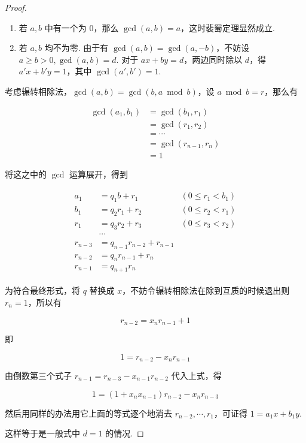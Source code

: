 \documentclass[a4paper]{article}
\begin{document}
\begin{proof}
    \begin{enumerate}
        \item 若 $a,b$ 中有一个为 $0$，那么 $\gcd(a,b)=a$，这时裴蜀定理显然成立. 
        \item 若 $a,b$ 均不为零. 由于有 $\gcd(a,b)=\gcd(a,-b)$，不妨设 $a\ge b>0,\gcd(a,b)=d$. 对于
              $ax+by=d$，两边同时除以 $d$，得 $a'x+b'y=1$，其中 $\gcd(a',b')=1$. 
    \end{enumerate}

    考虑辗转相除法，$\gcd(a,b)=\gcd(b,a\bmod b)$，设 $a\bmod b = r$，那么有

    \begin{equation*}
        \begin{split}
            \gcd(a_1,b_1)&=\gcd(b_1,r_1)\\
            &=\gcd(r_1,r_2)\\
            &=\cdots\\
            &=\gcd(r_{n-1},r_n)\\
            &=1
        \end{split}
    \end{equation*}

    将这之中的 $\gcd$ 运算展开，得到

    \begin{equation*}
        \begin{split}
            \begin{aligned}
                a_1 &= q_1b+r_1 &(0\leq r_1<b_1) \\ 
                b_1 &= q_2r_1+r_2 &(0\leq r_2<r_1) \\ 
                r_1 &= q_3r_2+r_3 &(0\leq r_3<r_2) \\ 
                &\cdots \\ 
                r_{n-3} &= q_{n-1}r_{n-2}+r_{n-1} \\
                r_{n-2} &= q_nr_{n-1}+r_n \\ 
                r_{n-1} &= q_{n+1}r_n
            \end{aligned}
        \end{split}
    \end{equation*}

    为符合最终形式，将 $q$ 替换成 $x$，不妨令辗转相除法在除到互质的时候退出则 $r_n=1$，所以有

    $$
    r_{n-2}=x_nr_{n-1}+1
    $$

    即

    $$
    1=r_{n-2}-x_nr_{n-1}
    $$

    由倒数第三个式子 $r_{n-1}=r_{n-3}-x_{n-1}r_{n-2}$ 代入上式，得

    $$
    1=(1+x_nx_{n-1})r_{n-2}-x_nr_{n-3}
    $$

    然后用同样的办法用它上面的等式逐个地消去 $r_{n-2},\cdots,r_1$，可证得 $1=a_1x+b_1y$. 
    
    这样等于是一般式中 $d=1$ 的情况. 
\end{proof}
\end{document}
